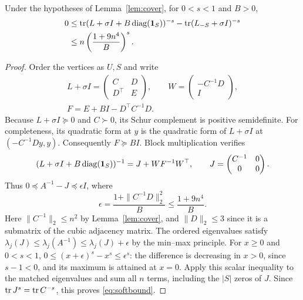 \begin{lemma}\label{lem:softlimit}
Under the hypotheses of Lemma~\ref{lem:cover}, for $0<s<1$ and $B>0$,
\begin{equation}\label{eq:softbound}
\begin{aligned}
 0&\leq \operatorname{tr}(L+\sigma I+B\operatorname{diag}(\mathbf 1_S))^{-s}
       -\operatorname{tr}(L_{-S}+\sigma I)^{-s}\\
 &\leq n\left(\frac{1+9n^4}{B}\right)^s.
\end{aligned}
\end{equation}
\end{lemma}
\begin{proof}
Order the vertices as $U,S$ and write
\begin{gather*}
 L+\sigma I=\begin{pmatrix}C&D\\D^\top&E\end{pmatrix},\qquad
 W=\begin{pmatrix}-C^{-1}D\\I\end{pmatrix},\\
 F=E+BI-D^\top C^{-1}D.
\end{gather*}
Because $L+\sigma I\succeq0$ and $C\succ0$, its Schur complement is
positive semidefinite. For completeness, its quadratic form at $y$
is the quadratic form of $L+\sigma I$ at $(-C^{-1}Dy,y)$.
Consequently $F\succeq BI$. Block multiplication verifies
\[
 (L+\sigma I+B\operatorname{diag}(\mathbf 1_S))^{-1}
 =J+WF^{-1}W^\top,\qquad J=\begin{pmatrix}C^{-1}&0\\0&0\end{pmatrix}.
\]
Thus $0\preceq A^{-1}-J\preceq\epsilon I$, where
\[
 \epsilon=\frac{1+\|C^{-1}D\|_2^2}{B}
 \leq\frac{1+9n^4}{B}.
\]
Here $\|C^{-1}\|_2\leq n^2$ by Lemma~\ref{lem:cover}, and
$\|D\|_2\leq3$ since it is a submatrix of the cubic adjacency matrix.
The ordered eigenvalues satisfy
$\lambda_j(J)\leq\lambda_j(A^{-1})\leq\lambda_j(J)+\epsilon$
by the min--max principle. For $x\geq0$ and $0<s<1$,
$0\leq(x+\epsilon)^s-x^s\leq\epsilon^s$:
the difference is decreasing in $x>0$, since $s-1<0$, and its
maximum is attained at $x=0$. Apply this scalar inequality to the
matched eigenvalues and sum all $n$ terms, including the $|S|$ zeros
of $J$. Since $\operatorname{tr} J^s=\operatorname{tr} C^{-s}$, this proves \eqref{eq:softbound}.
\end{proof}

